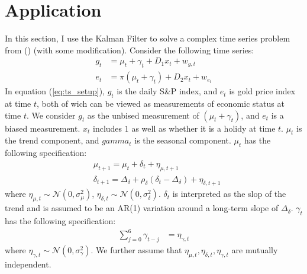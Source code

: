 \documentclass[12pt]{article}
\numberwithin{equation}{section}
\begin{document}
\section{Application} \label{sec:apply}
In this section, I use the Kalman Filter to solve a complex time series problem from (\cite{brodersen_etal_2015}) (with some modification). Consider the following time series: 
\begin{align}
    g_t &= \mu_t + \gamma_t + D_1x_t + w_{g,t} \label{eq:ts_setup} \\
    e_t &= \pi(\mu_t + \gamma_t) + D_2x_t + w_{e_t}
\end{align}
In equation (\ref{eq:ts_setup}), $g_t$ is the daily S\&P index, and $e_t$ is gold price index at time $t$, both of wich can be viewed as measurements of economic status at time $t$. We consider $g_t$ as the unbised measurement of $(\mu_t+\gamma_t)$, and $e_t$ is a biased measurement. $x_t$ includes $1$ as well as whether it is a holidy at time $t$. $\mu_t$ is the trend component, and $gamma_t$ is the seasonal component. $\mu_t$ has the following specification:
\begin{align}
    &\mu_{t+1} = \mu_{t} + \delta_t + \eta_{\mu,t+1} \\
    &\delta_{t+1} = \Delta_{\delta} + \rho_{\delta}(\delta_t - \Delta_{\delta}) + \eta_{\delta,t+1} 
\end{align}
where $\eta_{\mu,t}\sim\mathcal{N}(0,\sigma_{\mu}^2)$, $\eta_{\delta,t}\sim\mathcal{N}(0,\sigma_{\delta}^2)$. $\delta_t$ is interpreted as the slop of the trend and is assumed to be an AR(1) variation around a long-term slope of $\Delta_{\delta}$. $\gamma_t$ has the following specification:
\begin{align}
    \sum_{j=0}^6\gamma_{t-j} &= \eta_{\gamma,t}
\end{align}
where $\eta_{\gamma,t}\sim\mathcal{N}(0,\sigma_{\gamma}^2)$. We further assume that $\eta_{\mu,t},\eta_{\delta,t},\eta_{\gamma,t}$ are mutually independent. 
\end{document}
